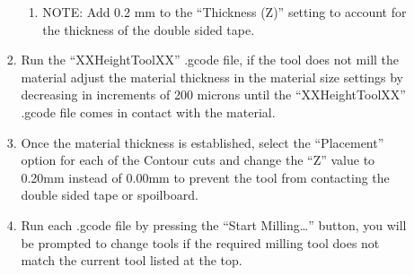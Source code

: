 \begin{enumerate}
\begin{enumerate}
\begin{enumerate}
			\begin{enumerate}
				\item NOTE: Add 0.2 mm to the “Thickness (Z)” setting to account for the thickness of the double sided tape.
			\end{enumerate}
		\item Run the “XXHeightToolXX” .gcode file, if the tool does not mill the material adjust the material thickness in the material size settings by decreasing in increments of 200 microns until the “XXHeightToolXX” .gcode file comes in contact with the material.
		\item Once the material thickness is established, select the “Placement” option for each of the Contour cuts and change the “Z” value to 0.20mm instead of 0.00mm to prevent the tool from contacting the double sided tape or spoilboard.  
		\item Run each .gcode file by pressing the “Start Milling…” button, you will be prompted to change tools if the required milling tool does not match the current tool listed at the top.
	\end{enumerate}
    \end{enumerate}
\end{enumerate}

